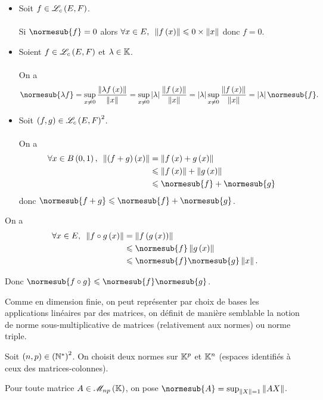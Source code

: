 \begin{dem}
\begin{itemize}
    \item Soit \(f\in\mathscr{L}_c\left(E,F\right)\). \\\\ Si \(\normesub{f}=0\) alors \(\quantifs{\forall x\in E}\norme{f\paren{x}}\leq0\times\norme{x}\) donc \(f=0\). \\
    \item Soient \(f\in\mathscr{L}_c\left(E,F\right)\) et \(\lambda\in\mathbb{K}\). \\\\ On a \[\normesub{\lambda f}=\sup_{x\not=0}\dfrac{\norme{\lambda f\paren{x}}}{\norme{x}}=\sup_{x\not=0}\abs{\lambda}\dfrac{\norme{f\paren{x}}}{\norme{x}}=\abs{\lambda}\sup_{x\not=0}\dfrac{\norme{f\paren{x}}}{\norme{x}}=\abs{\lambda}\normesub{f}.\]
    \item Soit \(\left(f,g\right)\in\mathscr{L}_c\left(E,F\right)^2\). \\\\ On a \[\begin{aligned}
        \quantifs{\forall x\in\bouleo{0}{1}}\norme{\paren{f+g}\paren{x}}&=\norme{f\paren{x}+g\paren{x}} \\
        &\leq\norme{f\paren{x}}+\norme{g\paren{x}} \\
        &\leq\normesub{f}+\normesub{g}
    \end{aligned}\] donc \(\normesub{f+g}\leq\normesub{f}+\normesub{g}\).
\end{itemize}
\end{dem}

\begin{dem}
On a \[\begin{aligned}
\quantifs{\forall x\in E}\norme{f\rond g\paren{x}}&=\norme{f\paren{g\paren{x}}} \\
&\leq\normesub{f}\norme{g\paren{x}} \\
&\leq\normesub{f}\normesub{g}\norme{x}.
\end{aligned}\]

Donc \(\normesub{f\rond g}\leq\normesub{f}\normesub{g}\).
\end{dem}

Comme en dimension finie, on peut représenter par choix de bases les applications linéaires par des matrices, on définit de manière semblable la notion de norme sous-multiplicative de matrices (relativement aux normes) ou norme triple.

\begin{defi}
Soit \(\left(n,p\right)\in\left(\mathbb{N}^*\right)^2\). On choisit deux normes sur \(\mathbb{K}^p\) et \(\mathbb{K}^n\) (espaces identifiés à ceux des matrices-colonnes).

Pour toute matrice \(A\in\M{np}\), on pose \(\normesub{A}=\sup_{\norme{X}=1}\norme{AX}\).
\end{defi}

